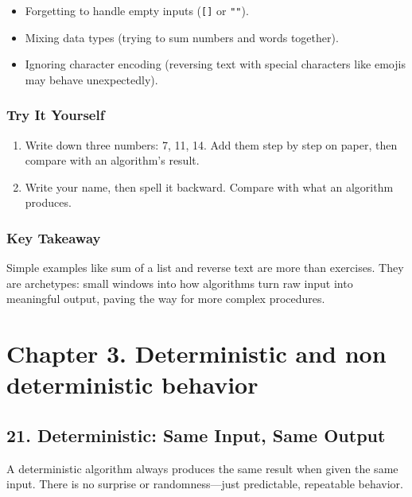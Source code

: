 \documentclass[
  letterpaper,
  DIV=11,
  numbers=noendperiod]{scrreprt}
\providecommand{\tightlist}{%
  \setlength{\itemsep}{0pt}\setlength{\parskip}{0pt}}
\begin{document}
\begin{itemize}
\tightlist
\item
  Forgetting to handle empty inputs (\texttt{{[}{]}} or \texttt{""}).
\item
  Mixing data types (trying to sum numbers and words together).
\item
  Ignoring character encoding (reversing text with special characters
  like emojis may behave unexpectedly).
\end{itemize}

\subsubsection{Try It Yourself}\label{try-it-yourself-19}

\begin{enumerate}
\def\labelenumi{\arabic{enumi}.}
\tightlist
\item
  Write down three numbers: 7, 11, 14. Add them step by step on paper,
  then compare with an algorithm's result.
\item
  Write your name, then spell it backward. Compare with what an
  algorithm produces.
\end{enumerate}

\subsubsection{Key Takeaway}\label{key-takeaway-18}

Simple examples like sum of a list and reverse text are more than
exercises. They are archetypes: small windows into how algorithms turn
raw input into meaningful output, paving the way for more complex
procedures.

\section{Chapter 3. Deterministic and non deterministic
behavior}\label{chapter-3.-deterministic-and-non-deterministic-behavior}

\subsection{21. Deterministic: Same Input, Same
Output}\label{deterministic-same-input-same-output}

A deterministic algorithm always produces the same result when given the
same input. There is no surprise or randomness---just predictable,
repeatable behavior.
\end{document}
